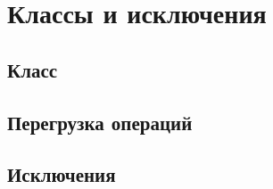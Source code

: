 \section{Классы и исключения}

\subsection{Класс}

\subsection{Перегрузка операций}

\subsection{Исключения}
